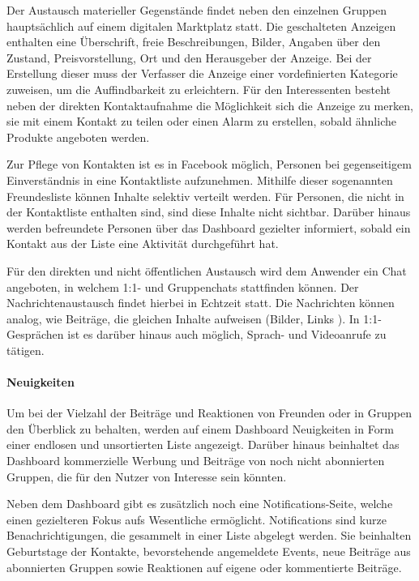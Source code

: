 Der Austausch materieller Gegenstände findet neben den einzelnen Gruppen hauptsächlich auf einem digitalen Marktplatz statt. Die geschalteten Anzeigen enthalten eine Überschrift, freie Beschreibungen, Bilder, Angaben über den Zustand, Preisvorstellung, Ort und den Herausgeber der Anzeige. Bei der Erstellung dieser muss der Verfasser die Anzeige einer vordefinierten Kategorie zuweisen, um die Auffindbarkeit zu erleichtern. Für den Interessenten besteht neben der direkten Kontaktaufnahme die Möglichkeit sich die Anzeige zu merken, sie mit einem Kontakt zu teilen oder einen Alarm zu erstellen, sobald ähnliche Produkte angeboten werden.

Zur Pflege von Kontakten ist es in Facebook möglich, Personen bei gegenseitigem Einverständnis in eine Kontaktliste aufzunehmen. Mithilfe dieser sogenannten Freundesliste können Inhalte selektiv verteilt werden. Für Personen, die nicht in der Kontaktliste enthalten sind, sind diese Inhalte nicht sichtbar. Darüber hinaus werden befreundete Personen über das Dashboard gezielter informiert, sobald ein Kontakt aus der Liste eine Aktivität durchgeführt hat.

Für den direkten und nicht öffentlichen Austausch wird dem Anwender ein Chat angeboten, in welchem 1:1- und Gruppenchats stattfinden können. Der Nachrichtenaustausch findet hierbei in Echtzeit statt. Die Nachrichten können analog, wie Beiträge, die gleichen Inhalte aufweisen (Bilder, Links \etc). In 1:1-Gesprächen ist es darüber hinaus auch möglich, Sprach- und Videoanrufe zu tätigen.

\paragraph{Neuigkeiten}

Um bei der Vielzahl der Beiträge und Reaktionen von Freunden oder in Gruppen den Überblick zu behalten, werden auf einem Dashboard Neuigkeiten in Form einer endlosen und unsortierten Liste angezeigt. Darüber hinaus beinhaltet das Dashboard kommerzielle Werbung und Beiträge von noch nicht abonnierten Gruppen, die für den Nutzer von Interesse sein könnten.

Neben dem Dashboard gibt es zusätzlich noch eine Notifications-Seite, welche einen gezielteren Fokus aufs Wesentliche ermöglicht. Notifications sind kurze Benachrichtigungen, die gesammelt in einer Liste abgelegt werden. Sie beinhalten \ua Geburtstage der Kontakte, bevorstehende angemeldete Events, neue Beiträge aus abonnierten Gruppen sowie Reaktionen auf eigene oder kommentierte Beiträge.

